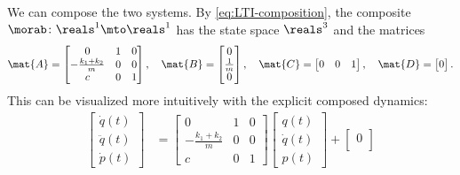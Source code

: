 \begin{example}
    We can compose the two systems.
    By \cref{eq:LTI-composition}, the composite $\morab \colon \reals^1 \mto \reals^1$ has the state space $\reals^3$ and the matrices
    \begin{equation*}
        \mat{A}=\begin{bmatrix}0                  & 1 & 0 \\
               -\frac{k_1+k_2}{m} & 0 & 0 \\
               c                  & 0 & 1\end{bmatrix},\quad
        \mat{B}=\begin{bmatrix}
            0 \\
            \frac{1}{m} \\
            0
        \end{bmatrix},
        \quad
        \mat{C}=\begin{bmatrix}
            0 & 0 & 1
        \end{bmatrix},
        \quad
        \mat{D}=\begin{bmatrix}
            0
        \end{bmatrix}.
    \end{equation*}
    This can be visualized more intuitively with the explicit composed dynamics:
    \begin{equation*}
        \begin{aligned}
            \begin{bmatrix}
                \dot{q}(t)  \\
                \ddot{q}(t) \\
                \dot{p}(t)
            \end{bmatrix} & =
            \begin{bmatrix}0                  & 1 & 0 \\
               -\frac{k_1+k_2}{m} & 0 & 0 \\
               c                  & 0 & 1\end{bmatrix} \begin{bmatrix}
                                                        {q}(t)     \\
                                                        \dot{q}(t) \\
                                                        {p}(t)
                                                    \end{bmatrix}+
            \begin{bmatrix}
                0 \\

\end{bmatrix}
\end{aligned}
\end{equation*}
\end{example}
